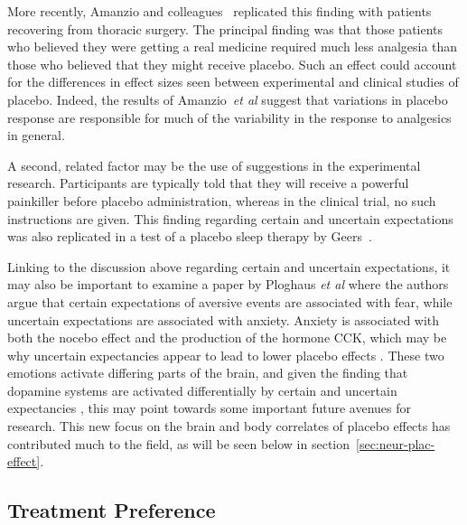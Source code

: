 More recently, Amanzio and colleagues~\cite{Amanzio2001} replicated this finding with patients recovering from thoracic surgery. The principal finding was that those patients who believed they were getting a real medicine required much less analgesia than those who believed that they might receive placebo. Such an effect could account for the differences in effect sizes seen between experimental and clinical studies of placebo. Indeed, the results of  Amanzio~\textit{et al} suggest that variations in placebo response are responsible for much of the variability in the response to analgesics in general.

A second, related factor may be the use of suggestions in the experimental research. Participants are typically told that they will receive a powerful painkiller before placebo administration, whereas in the clinical trial, no such instructions are given. This finding regarding certain and uncertain expectations was also replicated in a test of a placebo sleep therapy by Geers~\cite{Geers2005a}.

Linking to the discussion above regarding certain and uncertain expectations, it may also be important to examine a paper by Ploghaus {\it et al\/} \cite{Ploghaus2003} where the authors argue that certain expectations of aversive events are associated with fear, while uncertain expectations are associated with anxiety. Anxiety is associated with both the nocebo effect and the production of the hormone CCK, which may be why uncertain expectancies appear to lead to lower placebo effects \cite{Colloca2008b}. These two emotions activate differing parts of the brain, and given the finding that dopamine systems are activated differentially by certain and uncertain expectancies \cite{Scott2007a}, this may point towards some important future avenues for research. This new focus on the brain and body correlates of placebo effects has contributed much to the field, as  will be seen below in section~\ref{sec:neur-plac-effect}.

\subsection{Treatment Preference}
\label{sec:treatment-preference}


